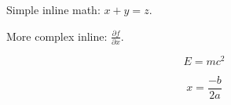 \documentclass{article}
\begin{document}
Simple inline math: $x + y = z$.

More complex inline: $\frac{\partial f}{\partial x}$.

$$E = mc^2$$

\begin{equation}
x = \frac{-b}{2a}
\end{equation}
\end{document}
